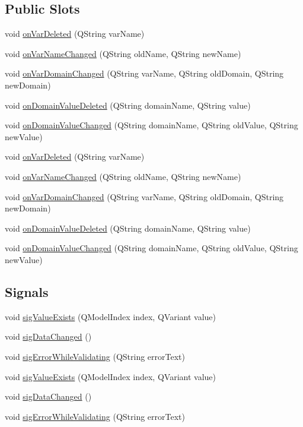 \subsection*{Public Slots}
\begin{DoxyCompactItemize}
\item 
void \hyperlink{class_rule_model_a448e41cb023fa37f31e12b2698374c42}{onVarDeleted} (QString varName)
\item 
void \hyperlink{class_rule_model_a1c203d29b59283fef2cc71b9f732c09f}{onVarNameChanged} (QString oldName, QString newName)
\item 
void \hyperlink{class_rule_model_a8f6db79b0a5e9e23fd7082b26c33dd16}{onVarDomainChanged} (QString varName, QString oldDomain, QString newDomain)
\item 
void \hyperlink{class_rule_model_a0ea3a96e3b56588ccb9fa3d7343f63c1}{onDomainValueDeleted} (QString domainName, QString value)
\item 
void \hyperlink{class_rule_model_a4cf8bdbb39a26359f162036f90e0576e}{onDomainValueChanged} (QString domainName, QString oldValue, QString newValue)
\item 
void \hyperlink{class_rule_model_a448e41cb023fa37f31e12b2698374c42}{onVarDeleted} (QString varName)
\item 
void \hyperlink{class_rule_model_a1c203d29b59283fef2cc71b9f732c09f}{onVarNameChanged} (QString oldName, QString newName)
\item 
void \hyperlink{class_rule_model_a8f6db79b0a5e9e23fd7082b26c33dd16}{onVarDomainChanged} (QString varName, QString oldDomain, QString newDomain)
\item 
void \hyperlink{class_rule_model_a0ea3a96e3b56588ccb9fa3d7343f63c1}{onDomainValueDeleted} (QString domainName, QString value)
\item 
void \hyperlink{class_rule_model_a4cf8bdbb39a26359f162036f90e0576e}{onDomainValueChanged} (QString domainName, QString oldValue, QString newValue)
\end{DoxyCompactItemize}
\subsection*{Signals}
\begin{DoxyCompactItemize}
\item 
void \hyperlink{class_rule_model_a0ba821000712b65e644f4f60cf22c5d4}{sigValueExists} (QModelIndex index, QVariant value)
\item 
void \hyperlink{class_rule_model_a216a40bdab6a9a6377de093bf3d2ddee}{sigDataChanged} ()
\item 
void \hyperlink{class_rule_model_aad58d1aac4757247837639c8c8d83433}{sigErrorWhileValidating} (QString errorText)
\item 
void \hyperlink{class_rule_model_a0ba821000712b65e644f4f60cf22c5d4}{sigValueExists} (QModelIndex index, QVariant value)
\item 
void \hyperlink{class_rule_model_a216a40bdab6a9a6377de093bf3d2ddee}{sigDataChanged} ()
\item 
void \hyperlink{class_rule_model_aad58d1aac4757247837639c8c8d83433}{sigErrorWhileValidating} (QString errorText)
\end{DoxyCompactItemize}

